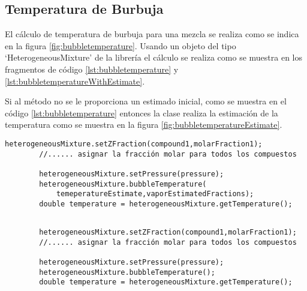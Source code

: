 \subsection{Temperatura de Burbuja}\label{subsec:bubbletemperature}

	El cálculo de temperatura de burbuja para una mezcla se realiza como se indica en la figura \ref{fig:bubbletemperature}. Usando un objeto del tipo `HeterogeneousMixture' de la librería \Materia el cálculo se realiza como se muestra en los fragmentos de código \ref{lst:bubbletemperature} y \ref{lst:bubbletemperatureWithEstimate}.

	Si al método no se le proporciona un estimado inicial, como se muestra en el código \ref{lst:bubbletemperature} entonces la clase realiza la estimación de la temperatura como se muestra en la figura \ref{fig:bubbletemperatureEstimate}. 

	\begin{lstlisting}[label={lst:bubbletemperatureWithEstimate},caption={Cálculo de la temperatura de burbuja proporcionando el estimado inicial de temperatura y de las fracciones molares del vapor.}]		
		heterogeneousMixture.setZFraction(compound1,molarFraction1);
		//...... asignar la fracción molar para todos los compuestos

		heterogeneousMixture.setPressure(pressure);
		heterogeneousMixture.bubbleTemperature(
			temeperatureEstimate,vaporEstimatedFractions);
		double temperature = heterogeneousMixture.getTemperature();
	\end{lstlisting}


	\begin{lstlisting}[label={lst:bubbletemperature},caption={Cálculo de la temperatura de burbuja.}]

		heterogeneousMixture.setZFraction(compound1,molarFraction1);
		//...... asignar la fracción molar para todos los compuestos

		heterogeneousMixture.setPressure(pressure);
		heterogeneousMixture.bubbleTemperature();
		double temperature = heterogeneousMixture.getTemperature();
	\end{lstlisting}


